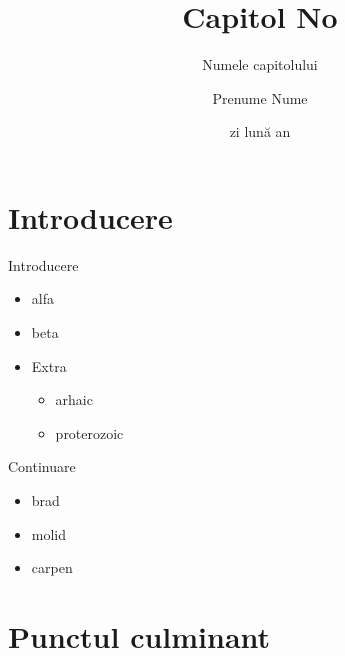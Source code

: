 \documentclass{training}
\title[Capitol No]{Capitol No}
\subtitle{Numele capitolului}
\author{Prenume Nume}
\date{zi lună an}
\begin{document}
\frame{\titlepage}

\frame{\tableofcontents}

\section{Introducere}

\begin{frame}{Introducere}
  \begin{itemize}
    \item alfa
    \item beta
    \item Extra
      \begin{itemize}
        \item arhaic
        \item proterozoic
      \end{itemize}
  \end{itemize}
\end{frame}

\begin{frame}{Continuare}
  \begin{itemize}
    \item brad
    \item molid
    \item carpen
  \end{itemize}
\end{frame}

\section{Punctul culminant}
\end{document}
